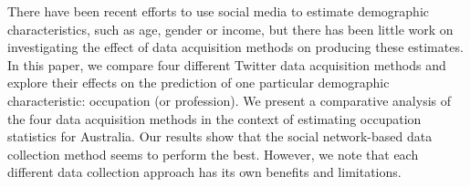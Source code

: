 There have been recent efforts to use social media to estimate demographic characteristics, such as age, gender or income, but there has been little work on investigating the effect of data acquisition methods on producing these estimates. In this paper, we compare four different Twitter data acquisition methods and explore their effects on the prediction of one particular demographic characteristic: occupation (or profession). We present a comparative analysis of the four data acquisition methods in the context of estimating occupation statistics for Australia.  Our results show that the social network-based data collection method seems to perform the best. However, we note that each different data collection approach has its own benefits and limitations.
